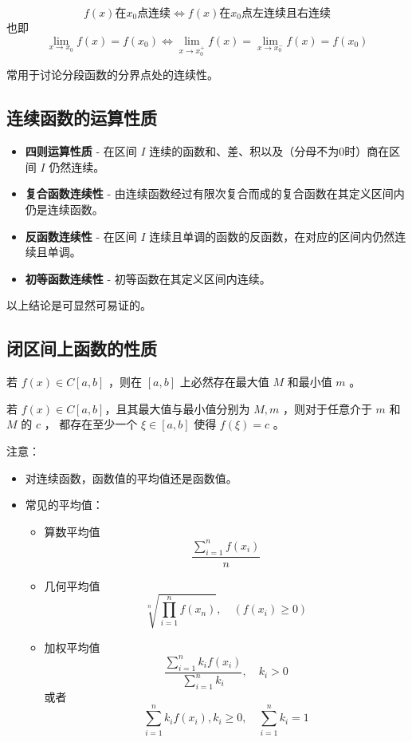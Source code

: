 \begin{Theo}[]

    $$
        f(x)\textrm{在}x_0\textrm{点连续}\Leftrightarrow
        f(x)\textrm{在}x_0\textrm{点左连续且右连续}
    $$ 
    也即$$
        {\displaystyle\lim_{x\rightarrow x_0}}f(x)=f(x_0)\Leftrightarrow
        {\displaystyle\lim_{x\rightarrow x_0^+}}f(x)={\displaystyle\lim_{x\rightarrow x_0^-}}f(x)=f(x_0)
    $$ 
\end{Theo}

常用于讨论分段函数的分界点处的连续性。

\subsection{连续函数的运算性质}

\begin{itemize}
    \item \textbf{四则运算性质} - 在区间 $ I $ 连续的函数和、差、积以及（分母不为0时）商在区间 $ I $ 仍然连续。
    \item \textbf{复合函数连续性} - 由连续函数经过有限次复合而成的复合函数在其定义区间内仍是连续函数。
    \item \textbf{反函数连续性} - 在区间 $ I $ 连续且单调的函数的反函数，在对应的区间内仍然连续且单调。
    \item \textbf{初等函数连续性} - 初等函数在其定义区间内连续。
\end{itemize}

以上结论是可显然可易证的。

\subsection{闭区间上函数的性质}

\begin{Theo}[最值定理]

    若 $ f(x)\in C[a,b] $ ，则在 $ [a,b] $ 上必然存在最大值 $ M $ 和最小值 $ m $ 。
\end{Theo}

\begin{Theo}[介值定理]

    若 $ f(x)\in C[a,b] $，且其最大值与最小值分别为 $ M,m $ ，则对于任意介于 $ m $ 和 $ M $ 的 $ c $ ，
    都存在至少一个 $ \xi\in[a,b] $ 使得 $ f(\xi)=c $ 。
\end{Theo}

注意：
\begin{itemize}
    \item 对连续函数，函数值的平均值还是函数值。
    \item 常见的平均值：\begin{itemize}
        \item 算数平均值$$
            \frac{\sum_{i=1}^n f(x_i)}{n}
        $$ 
        \item 几何平均值$$
            \sqrt[n]{\prod_{i=1}^n f(x_n)},\quad{} (f(x_i)\geq0)
        $$ 
        \item 加权平均值$$
            \frac{\sum_{i=1}^n k_if(x_i)}{\sum_{i=1}^nk_i},\quad{}k_i>0
        $$ 
        或者$$
            \sum_{i=1}^nk_i f(x_i),k_i\geq0,\quad{}\sum_{i=1}^nk_i=1
        $$ 
    \end{itemize}
\end{itemize}

